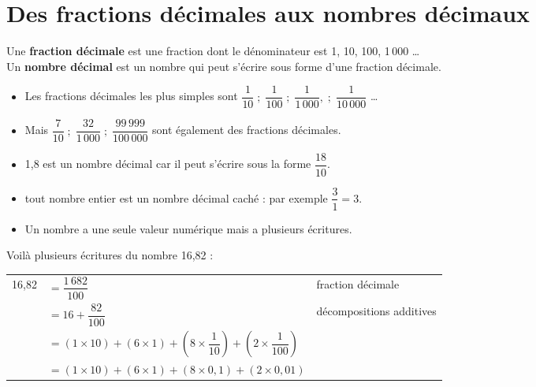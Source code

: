 \section{Des fractions décimales aux nombres décimaux}

\begin{definition}
   Une {\bf fraction décimale} est une fraction dont le dénominateur est  1, 10, 100, 1\,000 \dots \\
   Un {\bf nombre décimal} est un nombre qui peut s'écrire sous forme d'une fraction décimale.
\end{definition}

\begin{exemple*1}
   \begin{itemize}
      \item Les fractions décimales les plus \og simples \fg{} sont $\dfrac{1}{10} \; ; \; \dfrac{1}{100} \; ; \;\dfrac{1}{1\,000}, \; ; \;\dfrac{1}{10\,000}$ \dots{}
      \item  Mais $\dfrac{7}{10} \; ; \; \dfrac{32}{1\,000}  \; ; \; \dfrac{99\,999}{100\,000}$ sont également des fractions décimales.
      \item 1,8 est un nombre décimal car il peut s'écrire sous la forme $\dfrac{18}{10}$. \\ [-9mm]
   \end{itemize}
\end{exemple*1}

\begin{remarques}
    \begin{itemize}
        \item tout nombre entier est un nombre décimal \og caché \fg : par exemple $\dfrac{3}{1} =3$.
        \item Un nombre a une seule valeur numérique mais a plusieurs écritures.
    \end{itemize}
\end{remarques}
   
\begin{exemple*1}
   Voilà plusieurs écritures du nombre 16,82 : \par\medskip
    {\renewcommand{\arraystretch}{1.5}
    \begin{tabular}{cp{7cm}p{4cm}}
      16,82 & $=\dfrac{1\,682}{100}$ & fraction décimale \\
      & $=16+\dfrac{82}{100}$ & décompositions additives \\
      & $=(1\times10)+(6\times1)+\left(8\times\dfrac{1}{10}\right)+\left(2\times\dfrac{1}{100}\right)$ & \\
      & $= (1\times10)+(6\times1)+(8\times0,1)+(2\times0,01)$ & \\  
   \end{tabular}}
\end{exemple*1}

